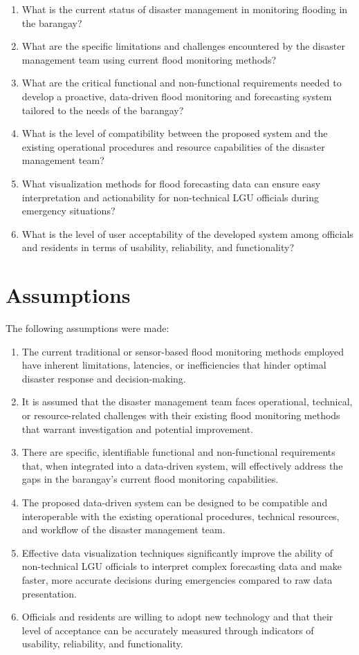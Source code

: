 \documentclass{research}
\begin{document}
\begin{enumerate}
    \item What is the current status of disaster management in monitoring flooding in the barangay?
    \item What are the specific limitations and challenges encountered by the disaster management team using current flood monitoring methods?
    \item What are the critical functional and non-functional requirements needed to develop a proactive, data-driven flood monitoring and forecasting system tailored to the needs of the barangay?
    \item What is the level of compatibility between the proposed system and the existing operational procedures and resource capabilities of the disaster management team?
    \item What visualization methods for flood forecasting data can ensure easy interpretation and actionability for non-technical LGU officials during emergency situations?
    \item What is the level of user acceptability of the developed system among officials and residents in terms of usability, reliability, and functionality?
\end{enumerate}

\section{Assumptions}

The following assumptions were made:

\begin{enumerate}
    \item The current traditional or sensor-based flood monitoring methods employed have inherent limitations, latencies, or inefficiencies that hinder optimal disaster response and decision-making.
    \item It is assumed that the disaster management team faces operational, technical, or resource-related challenges with their existing flood monitoring methods that warrant investigation and potential improvement.
    \item There are specific, identifiable functional and non-functional requirements that, when integrated into a data-driven system, will effectively address the gaps in the barangay's current flood monitoring capabilities.
    \item The proposed data-driven system can be designed to be compatible and interoperable with the existing operational procedures, technical resources, and workflow of the disaster management team.
    \item Effective data visualization techniques significantly improve the ability of non-technical LGU officials to interpret complex forecasting data and make faster, more accurate decisions during emergencies compared to raw data presentation.
    \item Officials and residents are willing to adopt new technology and that their level of acceptance can be accurately measured through indicators of usability, reliability, and functionality.
\end{enumerate}
\end{document}
